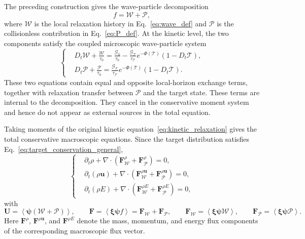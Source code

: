 \documentclass[preprint,12pt]{elsarticle}
\begin{document}
The preceding construction gives the wave-particle decomposition
\begin{equation}\label{eq:wp_decomposition}
    f=\mathcal{W}+\mathcal{P},
\end{equation}
where $\mathcal{W}$ is the local relaxation history in Eq.~\eqref{eq:wave_def} and $\mathcal{P}$ is the collisionless contribution in Eq.~\eqref{eq:P_def}. At the kinetic level, the two components satisfy the coupled microscopic wave-particle system
\begin{equation}\label{eq:wp_conservative_system}
\left\{
\begin{aligned}
&D_t\mathcal{W}+\frac{\mathcal{W}}{\tau_0}
    =
    \frac{\mathcal{G}_0}{\tau_0}
    -\frac{\mathcal{G}_\mathcal{T}}{\tau_\mathcal{T}}e^{-\Phi(\mathcal{T})}\left(1-D_t \mathcal{T}\right),
    \\
&D_t\mathcal{P}+\frac{\mathcal{P}}{\tau_0}
    =
    \frac{\mathcal{G}_\mathcal{T}}{\tau_\mathcal{T}}e^{-\Phi(\mathcal{T})}\left(1-D_t \mathcal{T}\right).
\end{aligned}
\right.
\end{equation}
These two equations contain equal and opposite local-horizon exchange terms, together with relaxation transfer between $\mathcal{P}$ and the target state. These terms are internal to the decomposition. They cancel in the conservative moment system and hence do not appear as external sources in the total equation.

Taking moments of the original kinetic equation~\eqref{eq:kinetic_relaxation} gives the total conservative macroscopic equations. Since the target distribution satisfies Eq.~\eqref{eq:target_conservation_general},
\begin{equation}\label{eq:macro_conservation}
\left\{
\begin{aligned}
&\partial_t\rho+\nabla\cdot\left(\mathbf F_{\mathcal{W}}^{\rho}+\mathbf F_{\mathcal{P}}^{\rho}\right)=0,\\
&\partial_t(\rho\boldsymbol{u})+\nabla\cdot\left(\mathbf F_{\mathcal{W}}^{\rho\boldsymbol{u}}+\mathbf F_{\mathcal{P}}^{\rho\boldsymbol{u}}\right)=0,\\
&\partial_t(\rho E)+\nabla\cdot\left(\mathbf F_{\mathcal{W}}^{\rho E}+\mathbf F_{\mathcal{P}}^{\rho E}\right)=0,
\end{aligned}
\right.
\end{equation}
with
\begin{equation}\label{eq:total_flux_split}
    \mathbf U=\left\langle \boldsymbol{\psi}(\mathcal{W}+\mathcal{P}) \right\rangle,
    \qquad
    \mathbf F
    =
    \left\langle \boldsymbol{\xi}\boldsymbol{\psi} f \right\rangle
    =
    \mathbf F_{\mathcal{W}}+\mathbf F_{\mathcal{P}},
    \qquad
    \mathbf F_{\mathcal{W}}=\left\langle \boldsymbol{\xi}\boldsymbol{\psi}\mathcal{W} \right\rangle,
    \qquad
    \mathbf F_{\mathcal{P}}=\left\langle \boldsymbol{\xi}\boldsymbol{\psi}\mathcal{P} \right\rangle.
\end{equation}
Here $\mathbf F^\rho$, $\mathbf F^{\rho\boldsymbol{u}}$, and $\mathbf F^{\rho E}$ denote the mass, momentum, and energy flux components of the corresponding macroscopic flux vector.
\end{document}

